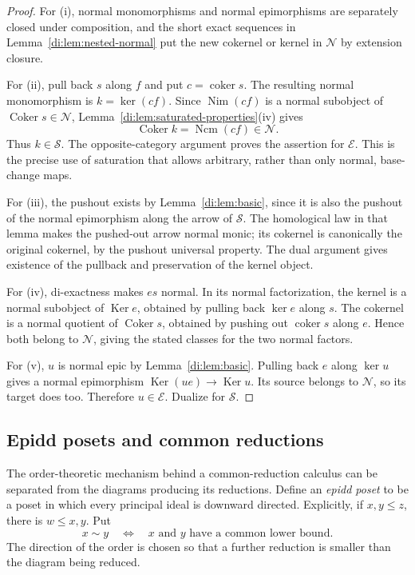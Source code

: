 \documentclass[11pt,reqno,a4paper]{amsart}
\theoremstyle{definition}
\theoremstyle{remark}
\DeclareMathOperator{\coker}{coker}
\newcommand{\N}{\mathcal{N}}
\newcommand{\0}{\mathbf{0}}
\renewcommand{\1}{\mathbf{1}}
\DeclareMathOperator{\Ker}{Ker}
\DeclareMathOperator{\Coker}{Coker}
\newcommand{\Nim}{\operatorname{Nim}}
\newcommand{\Ncm}{\operatorname{Ncm}}
\newcommand{\Sden}{\mathcal S}
\newcommand{\Eden}{\mathcal E}
\begin{document}
\begin{proof}
For (i), normal monomorphisms and normal epimorphisms are separately closed under composition, and the short exact sequences in Lemma~\ref{di:lem:nested-normal} put the new cokernel or kernel in $\N$ by extension closure.

For (ii), pull back $s$ along $f$ and put $c=\coker s$. The resulting normal monomorphism is $k=\ker(cf)$. Since $\Nim(cf)$ is a normal subobject of $\Coker s\in\N$, Lemma~\ref{di:lem:saturated-properties}(iv) gives
\[
 \Coker k=\Ncm(cf)\in\N.
\]
Thus $k\in\Sden$. The opposite-category argument proves the assertion for $\Eden$. This is the precise use of saturation that allows arbitrary, rather than only normal, base-change maps.

For (iii), the pushout exists by Lemma~\ref{di:lem:basic}, since it is also the pushout of the normal epimorphism along the arrow of $\Sden$. The homological law in that lemma makes the pushed-out arrow normal monic; its cokernel is canonically the original cokernel, by the pushout universal property. The dual argument gives existence of the pullback and preservation of the kernel object.

For (iv), di-exactness makes $es$ normal. In its normal factorization, the kernel is a normal subobject of $\Ker e$, obtained by pulling back $\ker e$ along $s$. The cokernel is a normal quotient of $\Coker s$, obtained by pushing out $\coker s$ along $e$. Hence both belong to $\N$, giving the stated classes for the two normal factors.

For (v), $u$ is normal epic by Lemma~\ref{di:lem:basic}. Pulling back $e$ along $\ker u$ gives a normal epimorphism $\Ker(ue)\to\Ker u$. Its source belongs to $\N$, so its target does too. Therefore $u\in\Eden$. Dualize for $\Sden$.
\end{proof}

\subsection{Epidd posets and common reductions}\label{subsec:epidd}

The order-theoretic mechanism behind a common-reduction calculus can be
separated from the diagrams producing its reductions. Define an \emph{epidd poset} to be a poset in which every
principal ideal is downward directed. Explicitly, if $x,y\leqslant z$,
there is $w\leqslant x,y$. Put
\[
 x\sim y\quad\Longleftrightarrow\quad
 \text{$x$ and $y$ have a common lower bound}.
\]
The direction of the order is chosen so that a further reduction is
smaller than the diagram being reduced.
\end{document}
